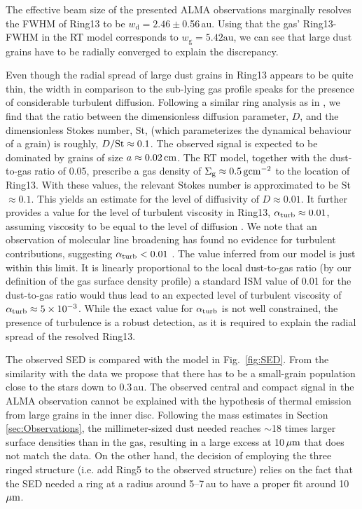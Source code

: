 \documentclass[usenatbib,times]{mnras}
\begin{document}
The effective beam size of the presented ALMA observations marginally resolves the FWHM of Ring13 to be $w_\mathrm{d} = 2.46\pm$0.56\,au. Using that the gas' Ring13-FWHM in the RT model corresponds to $w_\mathrm{g} = 5.42\mathrm{au}$, we can see that large dust grains have to be radially converged to explain the discrepancy.

Even though the radial spread of large dust grains in Ring13 appears to be quite thin, the width in comparison to the sub-lying gas profile speaks for the presence of considerable turbulent diffusion. Following a similar ring analysis as in \citet{2018ApJ...869L..46D}, we find that the ratio between the dimensionless diffusion parameter, $D$, and the dimensionless Stokes number, St, (which parameterizes the dynamical behaviour of a grain) is roughly, $D/{\rm St}\approx 0.1$. The observed signal is expected to be dominated by grains of size $a\approx 0.02\,{\rm cm}$. The RT model, together with the dust-to-gas ratio of 0.05, prescribe a gas density of $\Sigma_{\rm g} \approx 0.5\,{\rm g}{\rm cm}^{-2}$ to the location of Ring13. With these values, the relevant Stokes number is approximated to be St$\approx 0.1$. This yields an estimate for the level of diffusivity of $D\approx 0.01$. It further provides a value for the level of turbulent viscosity in Ring13, $\alpha_{\rm turb}\approx 0.01$, assuming viscosity to be equal to the level of diffusion \citep{2007Icar..192..588Y}. We note that an observation of molecular line broadening has found no evidence for turbulent contributions, suggesting $\alpha_{\rm turb}<0.01$ \citep{Flaherty_2020}. The value inferred from our model is just within this limit. It is linearly proportional to the local dust-to-gas ratio (by our definition of the gas surface density profile) a standard ISM  value of 0.01 for the dust-to-gas ratio would thus lead to an expected level of turbulent viscosity of $\alpha_{\rm turb}\approx 5\times10^{-3}$. While the exact value for $\alpha_{\rm turb}$ is not well constrained, the presence of turbulence is a robust detection, as it is required to explain the radial spread of the resolved Ring13.

The observed SED is compared with the model in Fig.~\ref{fig:SED}. From the similarity with the data we propose that there has to be a small-grain population close to the stars down to 0.3\,au. The observed central and compact signal in the ALMA observation cannot be explained with the hypothesis of thermal emission from large grains in the inner disc. Following the mass estimates in Section\,\ref{sec:Observations}, the millimeter-sized dust needed reaches $\sim$18 times larger surface densities than in the gas, resulting in a large excess at 10$\,\hbox{$\mu$m}$ that does not match the data. On the other hand, the decision of employing the three ringed structure (i.e. add Ring5 to the observed structure) relies on the fact that the SED needed a ring at a radius around 5--7\,au to have a proper fit around 10\,$\hbox{$\mu$m}$. 
\end{document}
